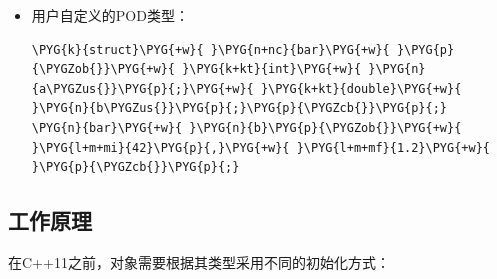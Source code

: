 \begin{itemize}

\item 用户自定义的POD类型：



\begin{codeblockbg}
\begin{Verbatim}[commandchars=\\\{\},breaklines=true,breakanywhere=true,fontsize=\codefont,xleftmargin=17bp]
\PYG{k}{struct}\PYG{+w}{ }\PYG{n+nc}{bar}\PYG{+w}{ }\PYG{p}{\PYGZob{}}\PYG{+w}{ }\PYG{k+kt}{int}\PYG{+w}{ }\PYG{n}{a\PYGZus{}}\PYG{p}{;}\PYG{+w}{ }\PYG{k+kt}{double}\PYG{+w}{ }\PYG{n}{b\PYGZus{}}\PYG{p}{;}\PYG{p}{\PYGZcb{}}\PYG{p}{;}
\PYG{n}{bar}\PYG{+w}{ }\PYG{n}{b}\PYG{p}{\PYGZob{}}\PYG{+w}{ }\PYG{l+m+mi}{42}\PYG{p}{,}\PYG{+w}{ }\PYG{l+m+mf}{1.2}\PYG{+w}{ }\PYG{p}{\PYGZcb{}}\PYG{p}{;}
\end{Verbatim}
\end{codeblockbg}

\end{itemize}



\subsection{工作原理}



在C++11之前，对象需要根据其类型采用不同的初始化方式：



